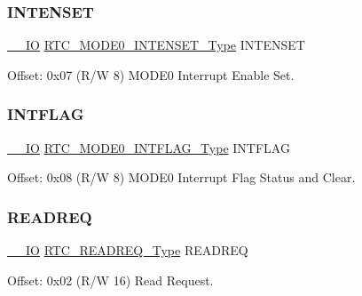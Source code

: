 \mbox{\label{struct_rtc_mode0_a13d129afc309b1c04013da81cd68c7a2}} 
\subsubsection{\texorpdfstring{INTENSET}{INTENSET}}
{\footnotesize\ttfamily \mbox{\hyperlink{core__cm0plus_8h_aec43007d9998a0a0e01faede4133d6be}{\+\_\+\+\_\+\+IO}} \mbox{\hyperlink{union_r_t_c___m_o_d_e0___i_n_t_e_n_s_e_t___type}{R\+T\+C\+\_\+\+M\+O\+D\+E0\+\_\+\+I\+N\+T\+E\+N\+S\+E\+T\+\_\+\+Type}} I\+N\+T\+E\+N\+S\+ET}



Offset\+: 0x07 (R/W 8) M\+O\+D\+E0 Interrupt Enable Set. 

\mbox{\label{struct_rtc_mode0_a6a1318e5b745f1a76f1ee998789414cb}} 
\subsubsection{\texorpdfstring{INTFLAG}{INTFLAG}}
{\footnotesize\ttfamily \mbox{\hyperlink{core__cm0plus_8h_aec43007d9998a0a0e01faede4133d6be}{\+\_\+\+\_\+\+IO}} \mbox{\hyperlink{union_r_t_c___m_o_d_e0___i_n_t_f_l_a_g___type}{R\+T\+C\+\_\+\+M\+O\+D\+E0\+\_\+\+I\+N\+T\+F\+L\+A\+G\+\_\+\+Type}} I\+N\+T\+F\+L\+AG}



Offset\+: 0x08 (R/W 8) M\+O\+D\+E0 Interrupt Flag Status and Clear. 

\mbox{\label{struct_rtc_mode0_aa1779f0fc09662a56db255c1637c56c0}} 
\subsubsection{\texorpdfstring{READREQ}{READREQ}}
{\footnotesize\ttfamily \mbox{\hyperlink{core__cm0plus_8h_aec43007d9998a0a0e01faede4133d6be}{\+\_\+\+\_\+\+IO}} \mbox{\hyperlink{union_r_t_c___r_e_a_d_r_e_q___type}{R\+T\+C\+\_\+\+R\+E\+A\+D\+R\+E\+Q\+\_\+\+Type}} R\+E\+A\+D\+R\+EQ}



Offset\+: 0x02 (R/W 16) Read Request. 

